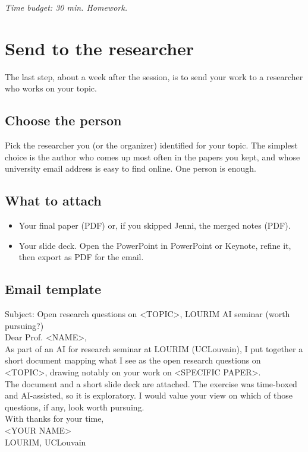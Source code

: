 \documentclass[11pt,a4paper]{article}
\begin{document}
\textit{Time budget: 30 min. Homework.}

\section{Send to the researcher}
\label{sec:send}

The last step, about a week after the session, is to send your work to a researcher who works on your topic.

\subsection*{Choose the person}
Pick the researcher you (or the organizer) identified for your topic. The simplest choice is the author who comes up most often in the papers you kept, and whose university email address is easy to find online. One person is enough.

\subsection*{What to attach}
\begin{itemize}[leftmargin=*, itemsep=1pt]
  \item Your final paper (PDF) or, if you skipped Jenni, the merged notes (PDF).
  \item Your slide deck. Open the PowerPoint in PowerPoint or Keynote, refine it, then export as PDF for the email.
\end{itemize}

\subsection*{Email template}

\begin{promptbox}
Subject: Open research questions on <TOPIC>, LOURIM AI seminar (worth pursuing?)\\[4pt]
Dear Prof. <NAME>,\\[2pt]
As part of an AI for research seminar at LOURIM (UCLouvain), I put together a short document mapping what I see as the open research questions on <TOPIC>, drawing notably on your work on <SPECIFIC PAPER>.\\[2pt]
The document and a short slide deck are attached. The exercise was time-boxed and AI-assisted, so it is exploratory. I would value your view on which of those questions, if any, look worth pursuing.\\[2pt]
With thanks for your time,\\
<YOUR NAME>\\
LOURIM, UCLouvain
\end{promptbox}
\end{document}
